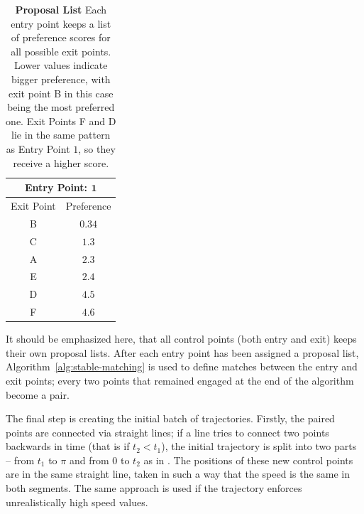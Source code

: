 \begin{table}[b]
	\centering
	\caption{
	\textbf{Proposal List} Each entry point keeps a list of preference scores for all possible exit points.
	Lower values indicate bigger preference, with exit point B in this case being the most preferred one.
	Exit Points F and D lie in the same pattern as Entry Point $1$, so they receive a higher score.
	}
	\begin{tabular}{|c|c|}
		\hline
		\multicolumn{2}{|c|}{\textbf{Entry Point: } $\mathbf{1}$}	\\
 		\hline
 		\hline
		Exit Point	&	Preference\\
		\hline
		\rowcolor[gray]{0.9}B	&	$\mathbf{0.34}$	\\
		C	&	$1.3$			\\
		A	&	$2.3$			\\
		E	&	$2.4$			\\
		D	&	$4.5$			\\
		F	&	$4.6$			\\
		\hline
		\end{tabular}
	\label{tab:proposal-list}
\end{table}

It should be emphasized here, that all control points (both entry and exit) keeps their own proposal lists.
After each entry point has been assigned a proposal list, Algorithm~\ref{alg:stable-matching} is used to define matches between the entry and exit points;
every two points that remained engaged at the end of the algorithm become a pair.

The final step is creating the initial batch of trajectories.
Firstly, the paired points are connected via straight lines;
if a line tries to connect two points backwards in time (that is if $t_2 < t_1$), the initial trajectory is split into two parts -- from $t_1$ to $\pi$ and from $0$ to $t_2$ as in \cite{Yersin:2009}.
The positions of these new control points are in the same straight line, taken in such a way that the speed is the same in both segments.
The same approach is used if the trajectory enforces unrealistically high speed values.

